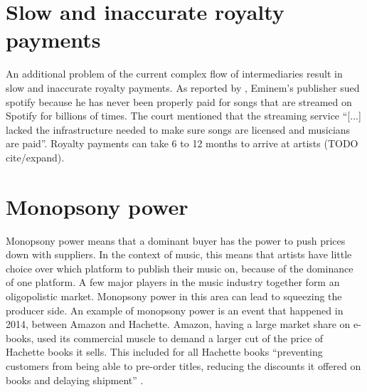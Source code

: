 \section{Slow and inaccurate royalty payments}
An additional problem of the current complex flow of intermediaries result in slow and inaccurate royalty payments. As reported by \cite{bbc2019}, Eminem's publisher sued spotify because he has never been properly paid for songs that are streamed on Spotify for billions of times. The court mentioned that the streaming service ``[...] lacked the infrastructure needed to make sure songs are licensed and musicians are paid''. Royalty payments can take 6 to 12 months to arrive at artists (TODO cite/expand). 

\section{Monopsony power}
Monopsony power means that a dominant buyer has the power to push prices down with suppliers. In the context of music, this means that artists have little choice over which platform to publish their music on, because of the dominance of one platform. A few major players in the music industry together form an oligopolistic market. Monopsony power in this area can lead to squeezing the producer side. 
An example of monopsony power is an event that happened in 2014, between Amazon and Hachette. Amazon, having a large market share on e-books, used its commercial muscle to demand a larger cut of the price of Hachette books it sells. This included for all Hachette books ``preventing customers from being able to pre-order titles, reducing the discounts it offered on books and delaying shipment'' \citep{theguardian2014amazon}. 

